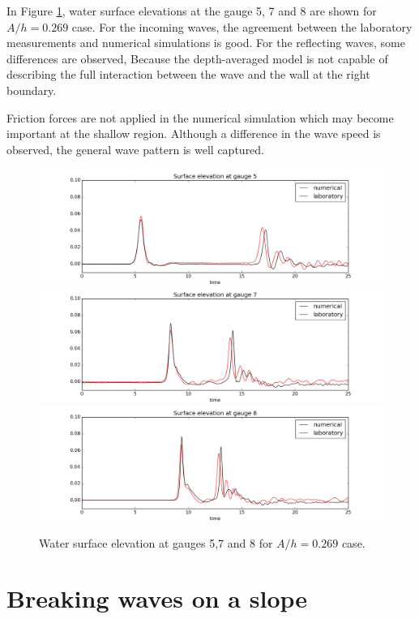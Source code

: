 \documentclass[review]{elsarticle}
\begin{document}
In Figure \ref{fig:bp5b_gauges}, water surface elevations
at the gauge 5, 7 and 8 are shown for $A/h=0.269$ case. 
For the incoming waves, the agreement 
between the laboratory measurements and numerical simulations is good. 
For the reflecting waves, some differences are observed,
Because the depth-averaged model is not capable 
of describing the full interaction between the wave and the wall
at the right boundary.
 
Friction forces are not applied in the numerical simulation
which may become important at the shallow region. 
Although a difference in the wave speed is observed,
the general wave pattern is well captured. 

\begin{figure}[!htb]
\centering
\includegraphics[width=.8\textwidth]{_fig/gauge0005fig300.png}\\
\includegraphics[width=.8\textwidth]{_fig/gauge0007fig300.png}\\
\includegraphics[width=.8\textwidth]{_fig/gauge0008fig300.png}
\caption{Water surface elevation at gauges 5,7 and 8 for $A/h=0.269$ case.}
\label{fig:bp5b_gauges}
\end{figure}

\section{Breaking waves on a slope}
\end{document}
